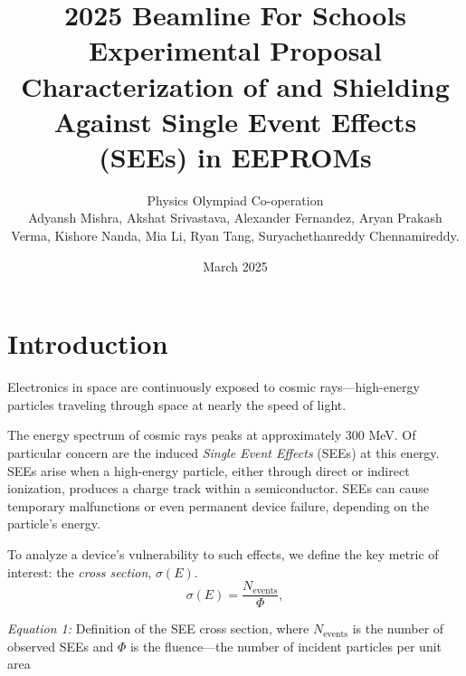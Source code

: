 \documentclass{article}
\title{\LARGE 2025 Beamline For Schools Experimental Proposal \\
{\Large\titlefontish Characterization of and Shielding Against Single Event Effects (SEEs) in EEPROMs}   
\vspace{-1em}
}
\author{\large Physics Olympiad Co-operation \\

{\normalfont\large
Adyansh Mishra,  
Akshat Srivastava,
Alexander Fernandez,  
Aryan Prakash Verma,  
Kishore Nanda,
Mia Li,
Ryan Tang,  
Suryachethanreddy Chennamireddy.  
}
}
\date{March 2025}
\begin{document}
\setcounter{section}{1}


\maketitle

\pagestyle{fancynotes}

\vspace*{-5.5em}
\part{Introduction}

Electronics in space are continuously exposed to cosmic rays—high-energy particles
traveling through space at nearly the speed of light. 

The energy spectrum of cosmic rays peaks at approximately 300 MeV. Of particular concern are the induced \textit{Single Event Effects} (SEEs) at this energy.
SEEs arise when a high-energy particle, either through direct or indirect ionization, produces a charge track within a semiconductor. SEEs can cause temporary malfunctions or even permanent device failure, depending on the particle's energy.

To analyze a device's vulnerability to such effects, we define the key metric of interest: the \textit{cross section}, $\sigma(E)$.
\begin{equation}
    \sigma (E) = \frac{N_{\text{events}}}{\Phi}, \tag{1}
    \label{eq: sat-cross-section}
\end{equation}

\textit{Equation 1:} Definition of the SEE cross section, where $N_{\text{events}}$ is the number of observed SEEs and $\Phi$ is the fluence---the number of incident
particles per unit area
\end{document}
